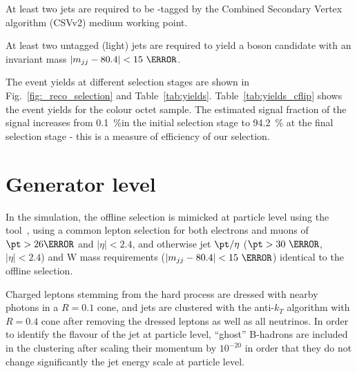 At least two jets are required to be \cPqb-tagged by the Combined Secondary Vertex algorithm (CSVv2) medium working point. 

At least two untagged (light) jets are required to yield a \PW boson candidate with an invariant mass $\left|m_{jj}-80.4\right|<15~\GeV$.

The event yields at different selection stages are shown in Fig.~\ref{fig:_reco_selection} and Table~\ref{tab:yields}. Table~\ref{tab:yields_cflip} shows the event yields for the colour octet \PW sample. The estimated signal fraction of the signal increases from 0.1~\%in the initial selection stage to 94.2~\% at the final selection stage - this is a measure of efficiency of our selection.







\section{Generator level}
\label{sec:generator_level}

In the simulation, the offline selection is mimicked at particle level using the \PSEUDOTOPPRODUCER tool~\cite{code:pseudotop}, using a common lepton selection for both electrons and muons of $\pt>26\GeV$ and $|\eta|<2.4$, and otherwise jet $\pt/\eta$ ($\pt>30~\GeV$, $|\eta|<2.4$) and W mass requirements ($\left|m_{jj}-80.4\right|<15~\GeV$) identical to the offline selection.

Charged leptons stemming from the hard process are dressed with nearby photons in a $R=0.1$ cone, and jets are clustered with the anti-$k_T$ algorithm with  $R=0.4$ cone after removing the dressed leptons as well as all neutrinos. In order to identify the flavour of the jet at particle level, ``ghost'' B-hadrons are included in the clustering after scaling their momentum by $10^{-20}$ in order that they do not change significantly the jet energy scale at particle level.
